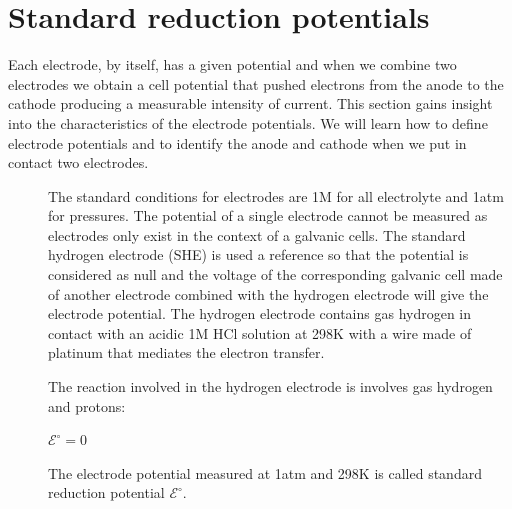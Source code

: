 \documentclass[main.tex]{subfiles}
\newcommand\chapterlabel{electrochem}
\begin{document}
\section{Standard reduction potentials}
Each electrode, by itself, has a given potential and when we combine two electrodes we obtain a cell potential that pushed electrons from the anode to the cathode producing a measurable intensity of current. This section gains insight into the characteristics of the electrode potentials. We will learn how to define electrode potentials and to identify the anode and cathode when we put in contact two electrodes.
\sloppy
\begin{description}
\item[]
The standard conditions for electrodes are 1M for all electrolyte and 1atm for pressures. The potential of a single electrode cannot be measured as electrodes only exist in the context of a galvanic cells. The standard hydrogen electrode (SHE) is used a reference so that the potential is considered as null and the voltage of the corresponding galvanic cell made of another electrode combined with the hydrogen electrode will give the electrode potential. The hydrogen electrode contains gas hydrogen in contact with an acidic 1M HCl solution at 298K with a wire made of platinum that mediates the electron transfer.
     \label{Fig:{\chapterlabel}\thefigurenewcounter}
 \begin{center}
\end{center}
The reaction involved in the hydrogen electrode is involves gas hydrogen and protons:
\begin{center} \hfill $\mathcal{E}^{\circ}=0$ \end{center}
The electrode potential measured at 1atm and 298K is called standard reduction potential $\mathcal{E}^{\circ}$.

\end{description}
\end{document}
